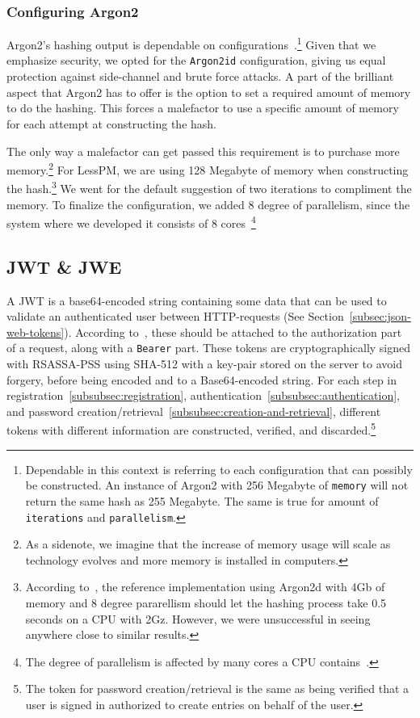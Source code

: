 \subsubsection{Configuring Argon2}
Argon2's hashing output is dependable on configurations~\cite{argon2specs}.\footnote{
  Dependable in this context is referring to each configuration that can
  possibly be constructed.
  An instance of Argon2 with 256 Megabyte of \texttt{memory} will not return the
  same hash as 255 Megabyte.
  The same is true for amount of \texttt{iterations} and \texttt{parallelism}.
}
Given that we emphasize security, we opted for the \texttt{Argon2id}
configuration, giving us equal protection against side-channel and brute
force attacks.
A part of the brilliant aspect that Argon2 has to offer is the option to set
a required amount of memory to do the hashing.
This forces a malefactor to use a specific amount of memory for each attempt
at constructing the hash.

The only way a malefactor can get passed this requirement is to purchase more
memory.\footnote{
  As a sidenote, we imagine that the increase of memory usage will scale as
  technology evolves and more memory is installed in computers.
}
For LessPM, we are using 128 Megabyte of memory when constructing the hash.\footnote{
  According to~\cite{argon2specs}, the reference implementation using Argon2d
  with 4Gb of memory and 8 degree pararellism should let the hashing process
  take 0.5 seconds on a CPU with 2Gz. However, we were unsuccessful in seeing
  anywhere close to similar results.
}
We went for the default suggestion of two iterations to compliment the memory.
To finalize the configuration, we added 8 degree of parallelism, since the
system where we developed it consists of 8 cores~\footnote{
  The degree of parallelism is affected by many cores a CPU
  contains~\cite{argon2specs}.
}


\subsection{JWT \& JWE}\label{subsec:jwt}
A JWT is a base64-encoded string containing some data that can be used to
validate an authenticated user between HTTP-requests (See
Section~\ref{subsec:json-web-tokens}).
According to~\cite{RFC7519}, these should be attached to the authorization
part of a request, along with a \texttt{Bearer} part.
These tokens are cryptographically signed with RSASSA-PSS using SHA-512 with
a key-pair stored on the server to avoid forgery, before being encoded and to a
Base64-encoded string.
For each step in registration~\ref{subsubsec:registration},
authentication~\ref{subsubsec:authentication}, and
password creation/retrieval~\ref{subsubsec:creation-and-retrieval}, different
tokens with different information are constructed, verified, and
discarded.\footnote{
  The token for password creation/retrieval is the same as being verified
  that a user is signed in authorized to create entries on behalf of the user.
}

